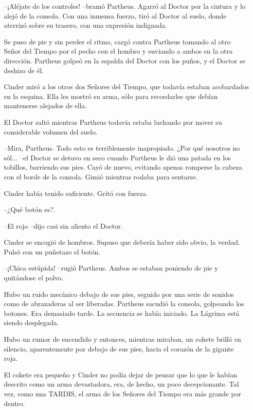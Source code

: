--¡Aléjate de los controles! --bramó Partheus. Agarró al Doctor por la cintura y lo alejó de la consola. Con una inmensa fuerza, tiró al Doctor al suelo, donde aterrizó sobre su trasero, con una expresión indignada.

Se puso de pie y sin perder el ritmo, cargó contra Partheus tomando al otro Señor del Tiempo por el pecho con el hombro y enviando a ambos en la otra dirección. Partheus golpeó en la espalda del Doctor con los puños, y el Doctor se deshizo de él.

Cinder miró a los otros dos Señores del Tiempo, que todavía estaban acobardados en la esquina. Ella les mostró su arma, sólo para recordarles que debían mantenerse alejados de ella.

El Doctor saltó mientras Partheus todavía estaba luchando por mover su considerable volumen del suelo.



--Mira, Partheus. Todo esto es terriblemente inapropiado. ¿Por qué nosotros no sól... --el Doctor se detuvo en seco cuando Partheus le dió una patada en los tobillos, barriendo sus pies. Cayó de nuevo, evitando apenas romperse la cabeza con el borde de la consola. Gimió mientras rodaba para sentarse.



Cinder había tenido suficiente. Gritó con fuerza. 



--¿Qué botón es?.

--El rojo --dijo casi sin aliento el Doctor.



Cinder se encogió de hombros. Supuso que debería haber sido obvio, la verdad. Pulsó con un puñetazo el botón.



--¡Chica estúpida! --rugió Partheus. Ambos se estaban poniendo de pie y quitándose el polvo.



Hubo un ruido mecánico debajo de sus pies, seguido por una serie de sonidos como de abrazaderas al ser liberadas. Partheus sacudió la consola, golpeando los botones. Era demasiado tarde. La secuencia se había iniciado. La Lágrima está siendo desplegada.

Hubo un rumor de encendido y entonces, mientras miraban, un cohete brilló en silencio, aparentemente por debajo de sus pies, hacia el corazón de la gigante roja.

El cohete era pequeño y Cinder no podía dejar de pensar que lo que le habían descrito como un arma devastadora, era, de hecho, un poco decepcionante. Tal vez, como una TARDIS, el arma de los Señores del Tiempo era más grande por dentro.

